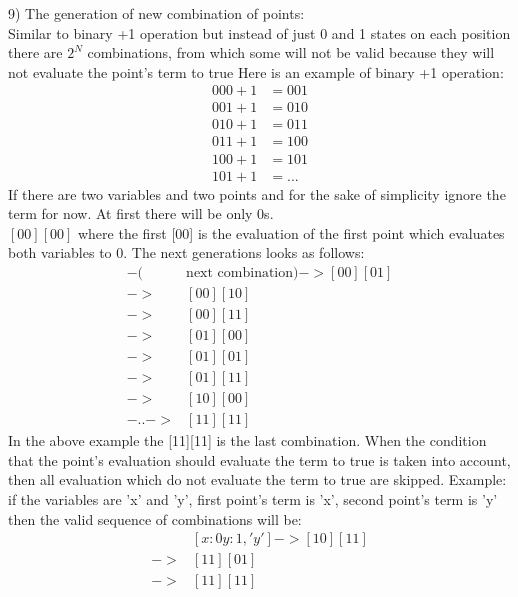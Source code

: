 \documentclass{article}
\begin{document}
			9) The generation of new combination of points: \\
				Similar to binary +1 operation but instead of just 0 and 1 states on each position there are $2^N$ combinations,
				from which some will not be valid because they will not evaluate the point's term to true
			\newline
			Here is an example of binary +1 operation:
			\begin{align*}
				000 + 1 &= 001 \\
				001 + 1 &= 010 \\
				010 + 1 &= 011 \\ 
				011 + 1 &= 100 \\
				100 + 1 &= 101 \\
				101 + 1 &= ...
			\end{align*}
			If there are two variables and two points and for the sake of simplicity ignore the term for now.
    			At first there will be only 0s. \\
			$[00][00]$ where the first [00] is the evaluation of the first point which evaluates both variables to 0.
			\newline
			The next generations looks as follows:
			\begin{align*}
				[00][00] -(&\text{next combination})-> [00][01] \\
				->& [00][10] \\
				->& [00][11] \\
				->& [01][00] \\
				->& [01][01] \\
				->& [01][11] \\
				->& [10][00] \\
				-..->& [11][11]
			\end{align*}
			In the above example the [11][11] is the last combination.
			\newline
    			When the condition that the point's evaluation should evaluate the term to true is taken into account, then all evaluation which do not evaluate the 
			term to true are skipped.
			\newline
    			Example: if the variables are 'x' and 'y', first point's term is 'x', second point's term is 'y' then the valid sequence of combinations will be:
			\begin{align*}
				[x:1 y:0, 'x']&[x:0 y:1, 'y'] -> [10][11]  \\
				->& [11][01] \\
				->& [11][11]
			\end{align*} %
			\newline
\end{document}
